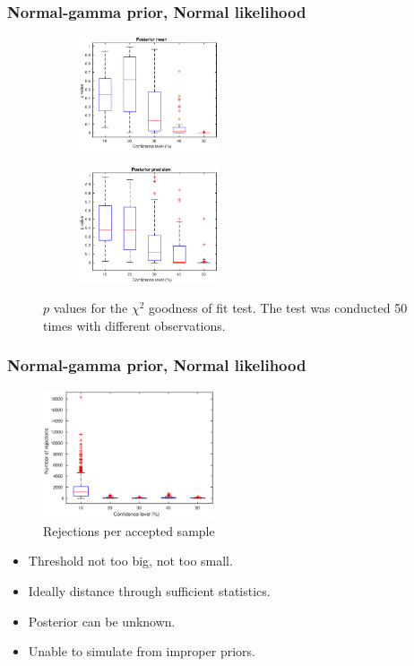 \documentclass{beamer}
\begin{document}
\begin{frame}
\frametitle{Normal-gamma prior, Normal likelihood}
\begin{figure}
\centering
\begin{subfigure}
\centering
\includegraphics[width=0.45\textwidth]{pvalue_mean.eps}
\end{subfigure}
\begin{subfigure}
\centering
\includegraphics[width=0.45\textwidth]{pvalue_precision.eps}
\end{subfigure}
\caption{$p$ values for the $\chi^2$ goodness of fit test. The test was conducted 50 times with different observations.}
\end{figure}
\end{frame}

\begin{frame}
\frametitle{Normal-gamma prior, Normal likelihood}
\begin{figure}
\centering
\includegraphics[width=0.45\textwidth]{rejections.eps}
\caption{Rejections per accepted sample}
\end{figure}
\end{frame}

\begin{frame}
\begin{itemize}
\item Threshold not too big, not too small.
\item Ideally distance through sufficient statistics.
\item Posterior can be unknown.
\item Unable to simulate from improper priors.
\end{itemize}
\end{frame}
\end{document}
